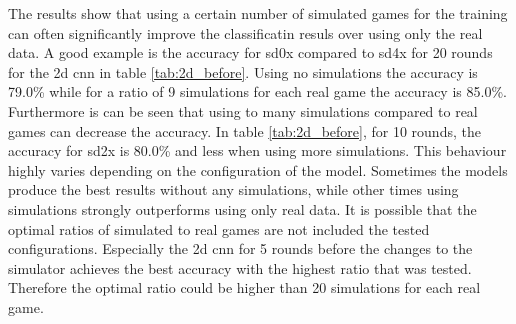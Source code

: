 

The results show that using a certain number of simulated games for the training can often significantly improve the classificatin resuls over using only the real data. A good example is the accuracy for sd0x compared to sd4x for 20 rounds for the 2d cnn in table \ref{tab:2d_before}. Using no simulations the accuracy is 79.0\% while for a ratio of 9 simulations for each real game the accuracy is 85.0\%. Furthermore is can be seen that using to many simulations compared to real games can decrease the accuracy. In table \ref{tab:2d_before}, for 10 rounds, the accuracy for sd2x is 80.0\% and less when using more simulations. This behaviour highly varies depending on the configuration of the model. Sometimes the models produce the best results without any simulations, while other times using simulations strongly outperforms using only real data. It is possible that the optimal ratios of simulated to real games are not included the tested configurations. Especially the 2d cnn for 5 rounds before the changes to the simulator achieves the best accuracy with the highest ratio that was tested. Therefore the optimal ratio could be higher than 20 simulations for each real game. 

